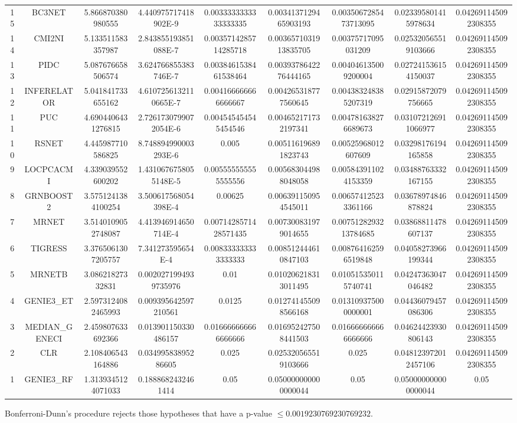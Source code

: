 \documentclass[a4paper,10pt]{article}
\begin{document}
\begin{landscape}
\begin{table}[!htp]
\begin{tabular}{ccccccccc}
15&BC3NET&5.866870380980555&4.440975717418902E-9&0.0033333333333333335&0.0034137129465903193&0.0035067285473713095&0.023395801415978634&0.042691145092308355\\
14&CMI2NI&5.133511583357987&2.843855193851088E-7&0.0035714285714285718&0.0036571031913835705&0.00375717095031209&0.025320565519103666&0.042691145092308355\\
13&PIDC&5.087676658506574&3.624766855383746E-7&0.0038461538461538464&0.0039378642276444165&0.004046135009200004&0.027241536154150037&0.042691145092308355\\
12&INFERELATOR&5.041841733655162&4.6107256132110665E-7&0.004166666666666667&0.004265318777560645&0.004383248385207319&0.02915872079756665&0.042691145092308355\\
11&PUC&4.6904406431276815&2.7261730799072054E-6&0.004545454545454546&0.004652171732197341&0.004781638276689673&0.031072126911066977&0.042691145092308355\\
10&RSNET&4.445987710586825&8.748894990003293E-6&0.005&0.005116196891823743&0.00525968012607609&0.03298176194165858&0.042691145092308355\\
9&LOCPCACMI&4.339039552600202&1.4310676758055148E-5&0.005555555555555556&0.005683044988048058&0.005843911024153359&0.03488763332167155&0.042691145092308355\\
8&GRNBOOST2&3.5751241384100254&3.500617568054398E-4&0.00625&0.006391150954545011&0.006574125233361166&0.03678974846878824&0.042691145092308355\\
7&MRNET&3.5140109052748087&4.413946914650714E-4&0.0071428571428571435&0.007300831979014655&0.0075128293213784685&0.03868811478607137&0.042691145092308355\\
6&TIGRESS&3.3765061307205757&7.341273595654E-4&0.008333333333333333&0.008512444610847103&0.008764162596519848&0.04058273966199344&0.042691145092308355\\
5&MRNETB&3.08621827332831&0.0020271994939735976&0.01&0.010206218313011495&0.010515350115740741&0.04247363047046482&0.042691145092308355\\
4&GENIE3_ET&2.5973124082465993&0.009395642597210561&0.0125&0.012741455098566168&0.013109375000000001&0.04436079457086306&0.042691145092308355\\
3&MEDIAN_GENECI&2.459807633692366&0.013901150330486157&0.016666666666666666&0.016952427508441503&0.016666666666666666&0.04624423930806143&0.042691145092308355\\
2&CLR&2.108406543164886&0.03499583895286605&0.025&0.025320565519103666&0.025&0.048123972012457106&0.042691145092308355\\
1&GENIE3_RF&1.3139345124071033&0.1888682432461414&0.05&0.050000000000000044&0.05&0.050000000000000044&0.05\\
\hline
\end{tabular}
\end{table}
Bonferroni-Dunn's procedure rejects those hypotheses that have a p-value $\le0.0019230769230769232$.



\end{landscape}
\end{document}

